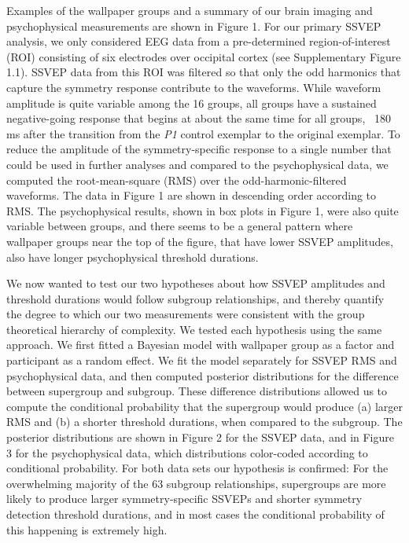 \documentclass[11pt, twoside]{article}
\begin{document}
Examples of the wallpaper groups and a summary of our brain imaging and psychophysical measurements are shown in Figure 1. For our primary SSVEP analysis, we only considered EEG data from a pre-determined region-of-interest (ROI) consisting of six electrodes over occipital cortex (see Supplementary Figure 1.1). SSVEP data from this ROI was filtered so that only the odd harmonics that capture the symmetry response contribute to the waveforms. While waveform amplitude is quite variable among the 16 groups, all groups have a sustained negative-going response that begins at about the same time for all groups, ~180 ms after the transition from the \textit{P1} control exemplar to the original exemplar. To reduce the amplitude of the symmetry-specific response to a single number that could be used in further analyses and compared to the psychophysical data, we computed the root-mean-square (RMS) over the odd-harmonic-filtered waveforms. The data in Figure 1 are shown in descending order according to RMS. The psychophysical results, shown in box plots in Figure 1, were also quite variable between groups, and there seems to be a general pattern where wallpaper groups near the top of the figure, that have lower SSVEP amplitudes, also have longer psychophysical threshold durations. 

We now wanted to test our two hypotheses about how SSVEP amplitudes and threshold durations would follow subgroup relationships, and thereby quantify the degree to which our two measurements were consistent with the group theoretical hierarchy of complexity. We tested each hypothesis using the same approach. We first fitted a Bayesian model with wallpaper group as a factor and participant as a random effect. We fit the model separately for SSVEP RMS and psychophysical data, and then computed posterior distributions for the difference between supergroup and subgroup. These difference distributions allowed us to compute the conditional probability that the supergroup would produce (a) larger RMS and (b) a shorter threshold durations, when compared to the subgroup. The posterior distributions are shown in Figure 2 for the SSVEP data, and in Figure 3 for the psychophysical data, which distributions color-coded according to conditional probability. For both data sets our hypothesis is confirmed: For the overwhelming majority of the 63 subgroup relationships, supergroups are more likely to produce larger symmetry-specific SSVEPs and shorter symmetry detection threshold durations, and in most cases the conditional probability of this happening is extremely high. 
\end{document}
